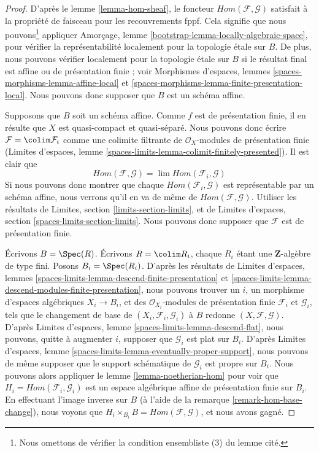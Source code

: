 \begin{proof}
D'après le lemme \ref{lemma-hom-sheaf}, le foncteur
$\mathit{Hom}(\mathcal{F}, \mathcal{G})$ satisfait à la propriété de faisceau
pour les recouvrements fppf. Cela signifie que nous pouvons\footnote{Nous
omettons de vérifier la condition ensembliste (3) du lemme cité.} appliquer
Amorçage, lemme \ref{bootstrap-lemma-locally-algebraic-space}, pour vérifier
la représentabilité localement pour la topologie \'etale sur $B$. De plus, nous
pouvons vérifier localement pour la topologie \'etale sur $B$ si le résultat
final est affine ou de présentation finie ; voir Morphismes d'espaces, lemmes
\ref{spaces-morphisms-lemma-affine-local} et
\ref{spaces-morphisms-lemma-finite-presentation-local}. Nous pouvons donc
supposer que $B$ est un schéma affine.

\medskip\noindent
Supposons que $B$ soit un schéma affine. Comme $f$ est de présentation finie,
il en résulte que $X$ est quasi-compact et quasi-séparé. Nous pouvons donc
écrire $\mathcal{F} = \colim \mathcal{F}_i$ comme une colimite filtrante de
$\mathcal{O}_X$-modules de présentation finie (Limites d'espaces, lemme
\ref{spaces-limits-lemma-colimit-finitely-presented}). Il est clair que
$$
\mathit{Hom}(\mathcal{F}, \mathcal{G}) =
\lim \mathit{Hom}(\mathcal{F}_i, \mathcal{G})
$$
Si nous pouvons donc montrer que chaque
$\mathit{Hom}(\mathcal{F}_i, \mathcal{G})$ est représentable par un schéma
affine, nous verrons qu'il en va de même de
$\mathit{Hom}(\mathcal{F}, \mathcal{G})$. Utiliser les résultats de Limites,
section \ref{limits-section-limits}, et de Limites d'espaces, section
\ref{spaces-limits-section-limits}. Nous pouvons donc supposer que
$\mathcal{F}$ est de présentation finie.

\medskip\noindent
Écrivons $B = \Spec(R)$. Écrivons $R = \colim R_i$, chaque $R_i$ étant une
$\mathbf{Z}$-algèbre de type fini. Posons $B_i = \Spec(R_i)$. D'après les
résultats de Limites d'espaces, lemmes
\ref{spaces-limits-lemma-descend-finite-presentation} et
\ref{spaces-limits-lemma-descend-modules-finite-presentation}, nous pouvons
trouver un $i$, un morphisme d'espaces algébriques $X_i \to B_i$, et des
$\mathcal{O}_{X_i}$-modules de présentation finie $\mathcal{F}_i$ et
$\mathcal{G}_i$, tels que le changement de base de
$(X_i, \mathcal{F}_i, \mathcal{G}_i)$ à $B$ redonne
$(X, \mathcal{F}, \mathcal{G})$. D'après Limites d'espaces, lemme
\ref{spaces-limits-lemma-descend-flat}, nous pouvons, quitte à augmenter $i$,
supposer que $\mathcal{G}_i$ est plat sur $B_i$. D'après Limites d'espaces,
lemme \ref{spaces-limits-lemma-eventually-proper-support}, nous pouvons de
même supposer que le support schématique de $\mathcal{G}_i$ est propre sur
$B_i$. Nous pouvons alors appliquer le lemme \ref{lemma-noetherian-hom} pour
voir que $H_i = \mathit{Hom}(\mathcal{F}_i, \mathcal{G}_i)$ est un espace
algébrique affine de présentation finie sur $B_i$. En effectuant l'image
inverse sur $B$ (à l'aide de la remarque \ref{remark-hom-base-change}), nous
voyons que $H_i \times_{B_i} B = \mathit{Hom}(\mathcal{F}, \mathcal{G})$,
et nous avons gagné.
\end{proof}

